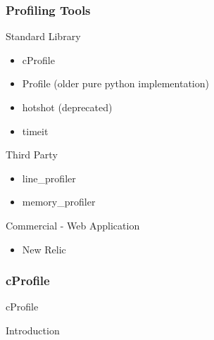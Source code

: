 \documentclass[c,english]{beamer}
\begin{document}
\begin{frame}[fragile]
\frametitle{Profiling Tools}


\begin{block}{ Standard Library }
\begin{itemize}

\item cProfile

\item Profile  (older pure python implementation)

\item hotshot  (deprecated)

\item timeit
\end{itemize}

\end{block}

\begin{block}{ Third Party }
\begin{itemize}

\item line\_profiler

\item memory\_profiler
\end{itemize}

\end{block}

\begin{block}{ Commercial - Web Application }
\begin{itemize}

\item New Relic
\end{itemize}

\end{block}
\end{frame}

\begin{frame}[fragile]
\frametitle{cProfile}


\begin{block}{ \centering \LARGE cProfile }

\centering \Large Introduction

\end{block}
\end{frame}
\end{document}
